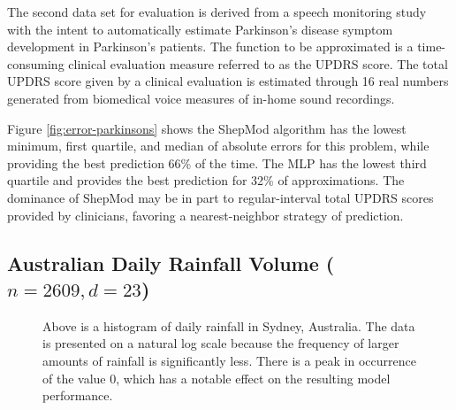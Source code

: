 \documentclass[smallextended,final]{svjour3}       %
\begin{document}
The second data set for evaluation \cite{tsanas2010accurate} is derived from a speech monitoring study with the intent to automatically estimate Parkinson's disease symptom development in Parkinson's patients. The function to be approximated is a time-consuming clinical evaluation measure referred to as the UPDRS score. The total UPDRS score given by a clinical evaluation is estimated through 16 real numbers generated from biomedical voice measures of in-home sound recordings.

Figure \ref{fig:error-parkinsons} shows the ShepMod algorithm has the lowest minimum, first quartile, and median of absolute errors for this problem, while providing the best prediction 66\% of the time. The MLP has the lowest third quartile and provides the best prediction for 32\% of approximations. The dominance of ShepMod may be in part to regular-interval total UPDRS scores provided by clinicians, favoring a nearest-neighbor strategy of prediction.



\subsection{Australian Daily Rainfall Volume ($n = 2609, d = 23$)}

\begin{figure}
  \centering
  \caption{Above is a histogram of daily rainfall in Sydney, Australia. The data is presented on a natural log scale because the frequency of larger amounts of rainfall is significantly less. There is a peak in occurrence of the value $0$, which has a notable effect on the resulting model performance.}
  \label{fig:hist-weather}
\end{figure}
\end{document}

